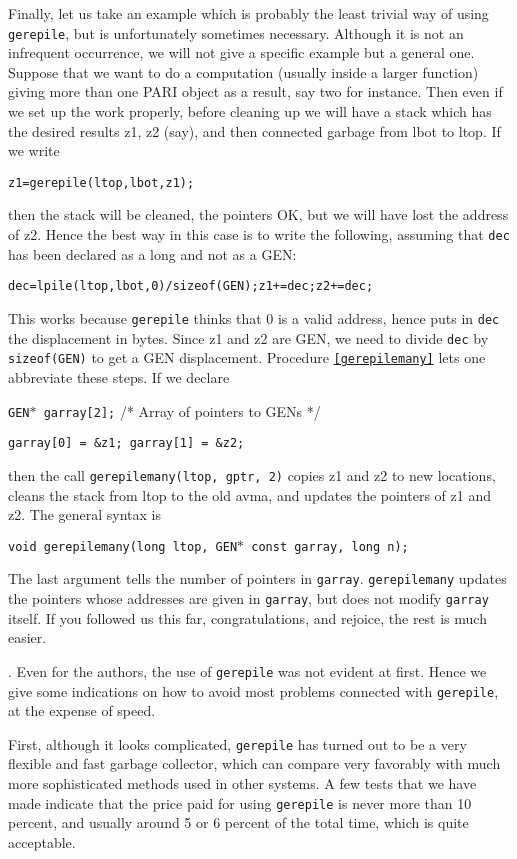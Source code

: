 Finally, let us take an example which is probably the least trivial way
of using {\tt gerepile}, but is unfortunately sometimes necessary. Although it
is not an infrequent occurrence, we will not give a specific example but
a general one. Suppose that we want to do a computation (usually inside
a larger function) giving more than one PARI object as a result, say two
for instance. Then even if we set up the work properly, before cleaning up
we will have a stack which has the desired results z1, z2 (say),
and then connected garbage from lbot to ltop. If we write

{\tt z1=gerepile(ltop,lbot,z1);}

then the stack will be cleaned, the pointers OK, but we will have lost the
address of z2. Hence the best way in this case is to write the following,
assuming that {\tt dec} has been declared as a long and not as a GEN:

{\tt dec=lpile(ltop,lbot,0)/sizeof(GEN);z1+=dec;z2+=dec;}

This works because {\tt gerepile} thinks that 0 is a valid address, hence puts in
{\tt dec} the displacement in bytes. Since z1 and z2 are GEN, we need to
divide {\tt dec} by {\tt sizeof(GEN)} to get a GEN displacement.
\smallskip
Procedure {\tt \ref{gerepilemany}} lets one abbreviate these steps.
If we declare

	{\tt GEN$*$ garray[2];} /* Array of pointers to GENs */

	{\tt garray[0] = \&z1; garray[1] = \&z2;}
	
then the call {\tt gerepilemany(ltop, gptr, 2)}
copies z1 and z2 to new locations,
cleans the stack from ltop to the old avma,
and updates the pointers of z1 and z2.  
The general syntax is

{\tt void gerepilemany(long ltop, GEN$*$ const garray, long n);}

The last argument tells the number of pointers in {\tt garray}.
{\tt gerepilemany} updates the pointers whose addresses are
given in {\tt garray}, but does not modify {\tt garray} itself.
\smallskip
If you followed us this far, congratulations, and rejoice, the rest is
much easier.

. Even for the authors, the use of {\tt gerepile}
was not evident at first. Hence we give some indications on how to avoid
most problems connected with {\tt gerepile}, at the expense of speed.

First, although it looks complicated, {\tt gerepile} has turned out to be a
very flexible and fast garbage collector, which can compare very favorably
with much more sophisticated methods used in other systems. A few tests
that we have made indicate that the price paid for using {\tt gerepile} is never
more than 10 percent, and usually around 5 or 6 percent of the total time,
which is quite acceptable.

